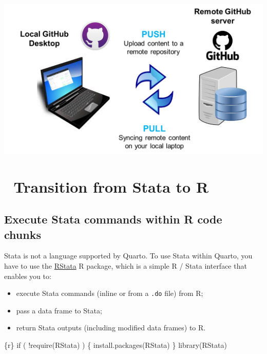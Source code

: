 \documentclass[
  letterpaper,
  DIV=11,
  numbers=noendperiod,
  oneside]{scrreprt}
\newenvironment{Shaded}{\begin{snugshade}}{\end{snugshade}}
\newcommand{\ControlFlowTok}[1]{\textcolor[rgb]{0.00,0.23,0.31}{#1}}
\newcommand{\FunctionTok}[1]{\textcolor[rgb]{0.28,0.35,0.67}{#1}}
\newcommand{\InformationTok}[1]{\textcolor[rgb]{0.37,0.37,0.37}{#1}}
\newcommand{\NormalTok}[1]{\textcolor[rgb]{0.00,0.23,0.31}{#1}}
\newcommand{\SpecialCharTok}[1]{\textcolor[rgb]{0.37,0.37,0.37}{#1}}
\newcommand{\StringTok}[1]{\textcolor[rgb]{0.13,0.47,0.30}{#1}}
\providecommand{\tightlist}{%
  \setlength{\itemsep}{0pt}\setlength{\parskip}{0pt}}\usepackage{longtable,booktabs,array}
\begin{document}
\includegraphics{images/paste-A340C143.png}

\hypertarget{transition-from-stata-to-r}{%
\chapter{\texorpdfstring{{📘} Transition from Stata to
R}{📘 Transition from Stata to R}}\label{transition-from-stata-to-r}}

\hypertarget{execute-stata-commands-within-r-code-chunks}{%
\section{Execute Stata commands within R code
chunks}\label{execute-stata-commands-within-r-code-chunks}}

Stata is not a language supported by Quarto. To use Stata within Quarto,
you have to use the
\href{https://cran.r-project.org/web/packages/RStata/README.html}{RStata}
R package, which is a simple R / Stata interface that enables you to:

\begin{itemize}
\tightlist
\item
  execute Stata commands (inline or from a \texttt{.do} file) from R;
\item
  pass a data frame to Stata;
\item
  return Stata outputs (including modified data frames) to R.
\end{itemize}

\begin{Shaded}
\begin{Highlighting}[]
\InformationTok{\textasciigrave{}\textasciigrave{}\textasciigrave{}\{r\}}
\ControlFlowTok{if}\NormalTok{ ( }\SpecialCharTok{!}\FunctionTok{require}\NormalTok{(RStata) ) \{}
  \FunctionTok{install.packages}\NormalTok{(}\StringTok{\textquotesingle{}RStata\textquotesingle{}}\NormalTok{)}
\NormalTok{\}}
\FunctionTok{library}\NormalTok{(RStata)}
\InformationTok{\textasciigrave{}\textasciigrave{}\textasciigrave{}}
\end{Highlighting}
\end{Shaded}
\end{document}
